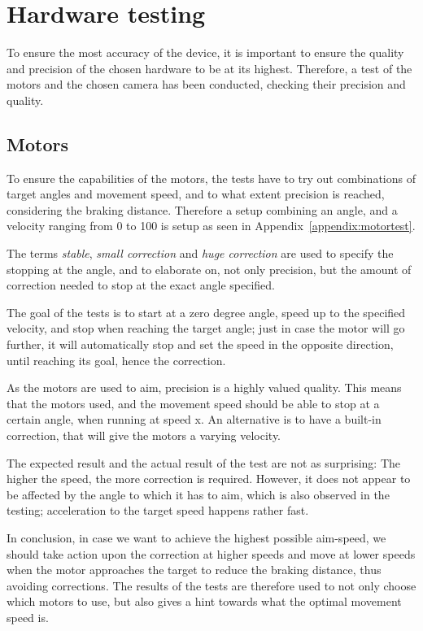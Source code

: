 \section{Hardware testing}\label{des:sec:hwtest}
To ensure the most accuracy of the device, it is important to ensure the quality and precision of the chosen hardware to be at its highest.
Therefore, a test of the motors and the chosen camera has been conducted, checking their precision and quality.

\subsection*{Motors}
To ensure the capabilities of the motors, the tests have to try out combinations of target angles and movement speed, and to what extent precision is reached, considering the braking distance.
Therefore a setup combining an angle, and a velocity ranging from 0 to 100 is setup as seen in Appendix~\ref{appendix:motortest}.

The terms \textit{stable}, \textit{small correction} and \textit{huge correction} are used to specify the stopping at the angle, and to elaborate on, not only precision, but the amount of correction needed to stop at the exact angle specified.

The goal of the tests is to start at a zero degree angle, speed up to the specified velocity, and stop when reaching the target angle; just in case the motor will go further, it will automatically stop and set the speed in the opposite direction, until reaching its goal, hence the correction.

As the motors are used to aim, precision is a highly valued quality.
This means that the motors used, and the movement speed should be able to stop at a certain angle, when running at speed x.
An alternative is to have a built-in correction, that will give the motors a varying velocity.

The expected result and the actual result of the test are not as surprising: The higher the speed, the more correction is required.
However, it does not appear to be affected by the angle to which it has to aim, which is also observed in the testing; acceleration to the target speed happens rather fast.

In conclusion, in case we want to achieve the highest possible aim-speed, we should take action upon the correction at higher speeds and move at lower speeds when the motor approaches the target to reduce the braking distance, thus avoiding corrections.
The results of the tests are therefore used to not only choose which motors to use, but also gives a hint towards what the optimal movement speed is.

